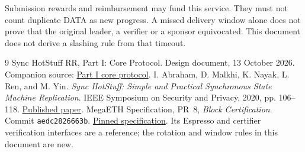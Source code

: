 \documentclass[11pt,a4paper]{article}
\newcounter{protocol}
\begin{document}
Submission rewards and reimbursement may fund this service. They must not
count duplicate DATA as new progress. A missed delivery window alone does
not prove that the original leader, a verifier or a sponsor equivocated.
This document does not derive a slashing rule from that timeout.

\begingroup\small
\begin{thebibliography}{9}
Sync HotStuff RR, Part I: Core Protocol. Design document, 13 October 2026.
Companion source: \href{run:sync_hotstuff_rr_part1_core.tex}{Part I core protocol}.
I. Abraham, D. Malkhi, K. Nayak, L. Ren, and M. Yin.
\emph{Sync HotStuff: Simple and Practical Synchronous State Machine Replication}.
IEEE Symposium on Security and Privacy, 2020, pp. 106--118.
\href{https://conferences.computer.org/sp/pdfs/sp/2020/349700a106.pdf}{Published paper}.
MegaETH Specification, PR~8, \emph{Block Certification}.
Commit \texttt{aedc2826663b}.
\href{https://github.com/megaeth-labs/specification/tree/aedc2826663b134ee25d26bea17e70c6d23d321c/specs/block-certification}{Pinned specification}.
Its Espresso and certifier verification interfaces are a reference;
the rotation and window rules in this document are new.
\end{thebibliography}
\endgroup
\end{document}
